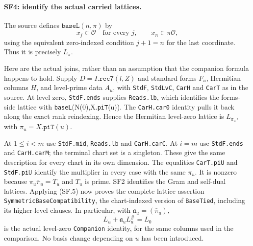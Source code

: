 \paragraph{SF4: identify the actual carried lattices.}
The source defines $\texttt{baseL}(n,\pi)$ by
\[
 x_j\in\mathcal O\quad\text{for every }j,
 \qquad x_n\in\pi\mathcal O,
                                                               \tag{SF.7}
\]
using the equivalent zero-indexed condition $j+1=n$ for the last
coordinate. Thus it is precisely $L_\pi$.

Here are the actual joins, rather than an assumption that the companion
formula happens to hold. Supply $D=I.\texttt{rec7}(l,Z)$ and standard
forms $F_u$, Hermitian columns $H$, and level-prime data $A_u$, with
\texttt{StdF}, \texttt{StdLvC}, \texttt{CarH} and \texttt{CarT}
as in the source. At level zero, \texttt{StdF.ends} supplies
\texttt{Reads.lb}, which identifies the forms-side lattice with
\texttt{baseL}(N(0),X.\texttt{piT}(u)). The \texttt{CarH.car0}
identity pulls it back along the exact rank reindexing. Hence the
Hermitian level-zero lattice is $L_{\pi_u}$, with
$\pi_u=X.\texttt{piT}(u)$.

At $1\le i<m$ use \texttt{StdF.mid}, \texttt{Reads.lb} and
\texttt{CarH.carC}. At $i=m$ use \texttt{StdF.ends} and
\texttt{CarH.carM}; the terminal chart set is a singleton.
These give the same description for every chart in its own dimension.
The equalities \texttt{CarT.piU} and \texttt{StdF.piU} identify
the multiplier in every case with the same $\pi_u$.
It is nonzero because $\pi_u\bar\pi_u=T_u$ and $T_u$ is prime.
SF2 identifies the Gram and self-dual lattices. Applying (SF.5) now
proves the complete lattice assertion
\texttt{SymmetricBaseCompatibility}, the chart-indexed version of
\texttt{BaseTied}, including its higher-level clauses. In particular, with
$\mathfrak a_u=(\bar\pi_u)$,
\[
 L_u+\mathfrak a_u L_u^\#=L_0                         \tag{SF.8}
\]
is the actual level-zero \texttt{Companion} identity, for the same
columns used in the comparison. No basis change depending on $u$ has
been introduced.

